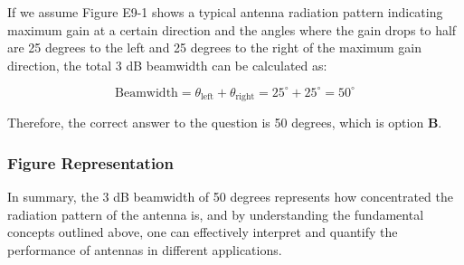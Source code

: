 If we assume Figure E9-1 shows a typical antenna radiation pattern indicating maximum gain at a certain direction and the angles where the gain drops to half are 25 degrees to the left and 25 degrees to the right of the maximum gain direction, the total 3 dB beamwidth can be calculated as:

\[
\text{Beamwidth} = \theta_{\text{left}} + \theta_{\text{right}} = 25^\circ + 25^\circ = 50^\circ
\]

Therefore, the correct answer to the question is 50 degrees, which is option \textbf{B}.

\subsubsection{Figure Representation}

\begin{center}
\end{center}

In summary, the 3 dB beamwidth of 50 degrees represents how concentrated the radiation pattern of the antenna is, and by understanding the fundamental concepts outlined above, one can effectively interpret and quantify the performance of antennas in different applications.
